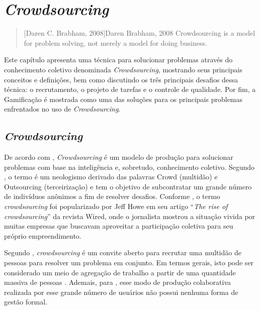\chapter{\textit{Crowdsourcing}}
\label{ch:crowdsourcing}

\begin{quotation}[Daren C. Brabham, 2008]{Daren Brabham, 2008}
Crowdsourcing is a model for problem solving, not merely a model for doing business.
\end{quotation}

Este capítulo apresenta uma técnica para solucionar problemas através do conhecimento coletivo denominada \textit{Crowdsourcing}, mostrando seus principais conceitos e definições, bem como discutindo os três principais desafios dessa técnica: o recrutamento, o projeto de tarefas e o controle de qualidade. Por fim, a Gamificação é mostrada como uma das soluções para os principais problemas enfrentados no uso de  \textit{Crowdsourcing}.

\section{\textit{Crowdsourcing}}
\label{sc:crowdsourcing}

De acordo com \cite{brabham2008}, \textit{Crowdsourcing} é um modelo de produção para solucionar problemas com base na inteligência e, sobretudo, conhecimento coletivo. Segundo \cite{schenk2009}, o termo é um neologismo derivado das palavras Crowd (multidão) e Outsourcing (terceirização) e tem o objetivo de subcontratar um grande número de indivíduos anônimos a fim de resolver desafios.  Conforme \cite{Paraschakis2013}, o termo \textit{crowdsourcing} foi popularizado por Jeff Howe em seu artigo “\textit{The rise of crowdsourcing}” \citep{howe2006} da revista Wired, onde o jornalista mostrou a situação vivida por muitas empresas que buscavam aproveitar a participação coletiva para seu próprio empreendimento.  

Segundo \cite{Hu2012}, \textit{crowdsourcing} é um convite aberto para recrutar uma multidão de pessoas para resolver um problema em conjunto. Em termos gerais, isto pode ser considerado um meio de agregação de trabalho a partir de uma quantidade massiva de pessoas \citep{surowiecki2005}. Ademais, para \cite{pintado2011},  esse modo de produção colaborativa realizada por esse grande número de usuários não possui nenhuma forma de gestão formal.

